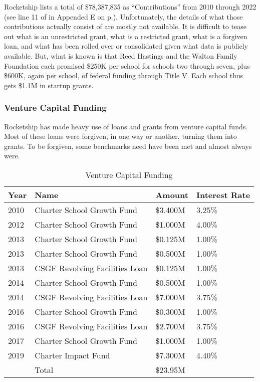 Rocketship lists a total of \$78,387,835 as ``Contributions'' from 2010 through 2022 (see line 11 of  in Appended E on p.\pageref{tab:consolidated_activities}). Unfortunately, the details of what those contributions actually consist of are mostly not available. It is difficult to tease out what is an unrestricted grant, what is a restricted grant, what is a forgiven loan, and what has been rolled over or consolidated given what data is publicly available. But, what is known is that Reed Hastings and the Walton Family Foundation each promised \$250K per school for schools two through seven, plus \$600K, again per school, of federal funding through Title V. Each school thus gets \$1.1M in startup grants.

\subsubsection{Venture Capital Funding}%
\label{sec:venture-capital_funding}\indent%

Rocketship has made heavy use of loans and grants from venture capital funds. Most of these loans were forgiven, in one way or another, turning them into grants. To be forgiven, some benchmarks need have been met and almost always were.

\begin{table}[ht]
  \SingleSpacing
  \caption{Venture Capital Funding}%
  \label{tab:venture_captial_funding}
  \begin{tabular}{llll}
    \toprule
    Year & Name                           & Amount   & Interest Rate \\
    \midrule
    2010 & Charter School Growth Fund     & \$3.400M & 3.25\%        \\
    2012 & Charter School Growth Fund     & \$1.000M & 4.00\%        \\
    2013 & Charter School Growth Fund     & \$0.125M & 1.00\%        \\
    2013 & Charter School Growth Fund     & \$0.500M & 1.00\%        \\
    2013 & CSGF Revolving Facilities Loan & \$0.125M & 1.00\%        \\
    2014 & Charter School Growth Fund     & \$0.500M & 1.00\%        \\
    2014 & CSGF Revolving Facilities Loan & \$7.000M & 3.75\%        \\
    2016 & Charter School Growth Fund     & \$0.300M & 1.00\%        \\
    2016 & CSGF Revolving Facilities Loan & \$2.700M & 3.75\%        \\
    2017 & Charter School Growth Fund     & \$1.000M & 1.00\%        \\
    2019 & Charter Impact Fund            & \$7.300M & 4.40\%        \\
    \midrule
         & Total                          & \$23.95M &               \\
    \bottomrule
  \end{tabular}
\end{table}

